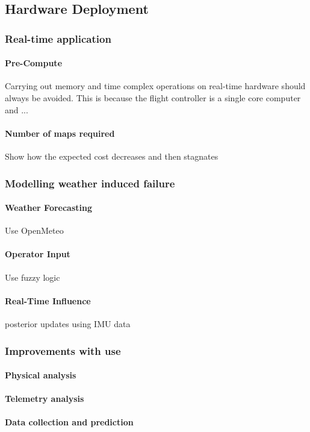 \subsection{Hardware Deployment}

\subsubsection{Real-time application}
\paragraph{Pre-Compute}
Carrying out memory and time complex operations on real-time hardware should always be avoided. This is because the flight controller is a single core computer and ...
\paragraph{Number of maps required}
Show how the expected cost decreases and then stagnates

\subsubsection{Modelling weather induced failure}
\paragraph{Weather Forecasting}
Use OpenMeteo
\paragraph{Operator Input}
Use fuzzy logic
\paragraph{Real-Time Influence}
posterior updates using \gls{IMU} data

\subsubsection{Improvements with use}
\paragraph{Physical analysis}
\paragraph{Telemetry analysis}
\paragraph{Data collection and prediction}